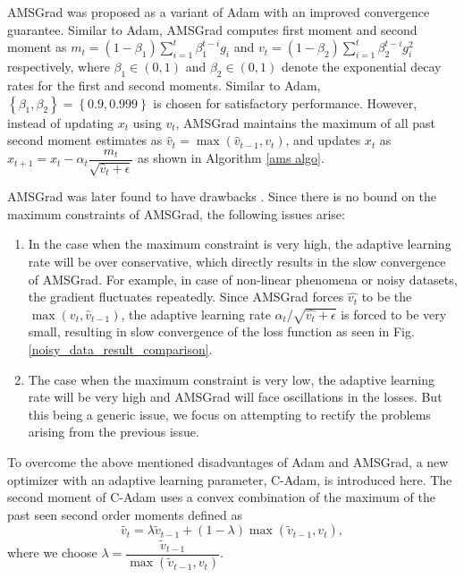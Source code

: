 \documentclass[12pt]{article}
\begin{document}
AMSGrad was proposed as a variant of Adam with an improved convergence guarantee. Similar to Adam, AMSGrad computes first moment and second moment as $m_{t} = (1-\beta_{1})\sum_{i=1}^{t}{\beta_{1}^{t-i}g_{i}}$ and $v_{t} = (1-\beta_{2})\sum_{i=1}^{t}{\beta_{2}^{t-i}g_{i}^{2}}$ respectively, where $\beta_{1} \in (0,1)$ and $\beta_{2} \in (0,1)$ denote the exponential decay rates for the first and second moments. Similar to Adam, $\left\{\beta_{1}, \beta_{2}\right\} = \left\{0.9, 0.999\right\}$ is chosen for satisfactory performance. However, instead of updating $x_{t}$ using $v_{t}$, AMSGrad maintains the maximum of all past second moment estimates as $\hat{v}_{t} = \max(\hat{v}_{t-1}, v_{t})$, and updates $x_{t}$ as $x_{t+1} = x_t-\alpha_{t}\dfrac{ m_t}{\sqrt{\hat{v}_{t}+\epsilon}}$ as shown in Algorithm \ref{ams algo}.


AMSGrad was later found to have drawbacks \cite{HuangWangDong2018, TanYinLiuWan2019}. Since there is no bound on the maximum constraints of AMSGrad, the following issues arise:
\begin{enumerate}
    \item In the case when the maximum constraint is very high, the adaptive learning rate will be over conservative, which directly results in the slow convergence of AMSGrad. For example, in case of non-linear phenomena or noisy datasets, the gradient fluctuates repeatedly. Since AMSGrad forces $\hat{v_{t}}$ to be the $\max(v_{t}, \hat{v}_{t-1})$, the adaptive learning rate $\alpha_{t}/\sqrt{\hat{v_t} + \epsilon}$ is forced to be very small, resulting in slow convergence of the loss function as seen in Fig. \ref{noisy_data_result_comparison}. \label{issue1}

  

   \item The case when the maximum constraint is very low, the adaptive learning rate will be very high and AMSGrad will face oscillations in the losses. But this being a generic issue, we focus on attempting to rectify the problems arising from the previous issue. \label{issue2}
\end{enumerate}


To overcome the above mentioned disadvantages of Adam and AMSGrad, a new optimizer with an adaptive learning parameter, C-Adam, is introduced here. The second moment of C-Adam uses a convex combination of the maximum of the past seen second order moments defined as 
\begin{equation}
    \tilde{v_{t}} = \lambda\tilde{v}_{t-1} + (1-\lambda)\max(\tilde{v}_{t-1}, v_{t}),
\end{equation}
where we choose $\lambda = \dfrac{\tilde{v}_{t-1}}{\max(\tilde{v}_{t-1}, v_{t})}$. 
\end{document}
